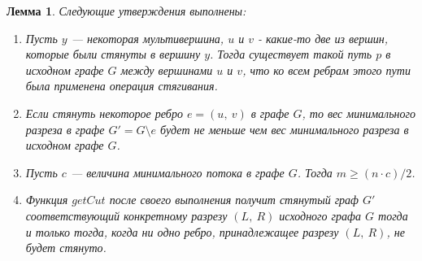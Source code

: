 \documentclass[a4paper,12pt]{article}
\newtheorem*{fulllemma}{Лемма}
\begin{document}
 \begin{fulllemma}
 Следующие утверждения выполнены:
 \begin{enumerate}
     \item Пусть $y$ — некоторая мультивершина, $u$ и $v$ - какие-то две из вершин, которые были стянуты в вершину $y$. Тогда существует такой путь $p$ в исходном графе $G$ между вершинами $u$ и $v$, что ко всем ребрам этого пути была применена операция стягивания.
     \item Если стянуть некоторое ребро $e = (u,\ v)$ в графе $G$, то вес минимального разреза в графе $G' = G\setminus e$ будет не меньше чем вес минимального разреза в исходном графе $G$.
     \item Пусть $c$ — величина минимального потока в графе $G$. Тогда $m \geqslant (n\cdot c)/2$.
     \item Функция $getCut$ после своего выполнения получит стянутый граф $G'$ соответствующий конкретному разрезу $(L,\ R)$ исходного графа $G$ тогда и только тогда, когда ни одно ребро, принадлежащее разрезу $(L,\ R)$, не будет стянуто.
 \end{enumerate}
 \end{fulllemma}
\end{document}
